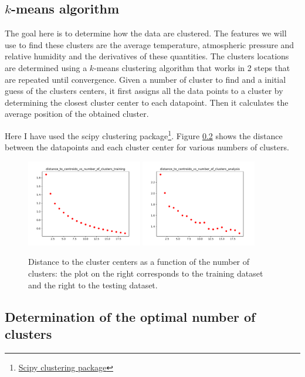 \documentclass[11pt]{amsart}
\begin{document}
\subsection{$k$-means algorithm}
The goal here is to determine how the data are clustered.
The features we will use to find these clusters are the average temperature, atmospheric pressure and relative humidity and the derivatives of these quantities.
The clusters locations are determined using a $k$-means clustering algorithm that works in 2 steps that are repeated until convergence.
Given a number of cluster to find and a initial guess of the clusters centers, it first assigns all the data points to a cluster by determining the closest cluster center to each datapoint.
Then it calculates the average position of the obtained cluster.

Here I have used the scipy clustering package\footnote{\href{https://docs.scipy.org/doc/scipy/reference/cluster.vq.html}{Scipy clustering package}}.
Figure \ref{} shows the distance between the datapoints and each cluster center for various numbers of clusters.

\begin{figure}
    \includegraphics[width=0.45\textwidth]{../plots/distance_to_centroids_vs_number_of_clusters_training.pdf}
    \includegraphics[width=0.45\textwidth]{../plots/distance_to_centroids_vs_number_of_clusters_analysis.pdf}
    \caption{Distance to the cluster centers as a function of the number of clusters: the plot on the right corresponds to the training dataset and the right to the testing dataset.}
\end{figure}




\subsection{Determination of the optimal number of clusters} 
\end{document}

